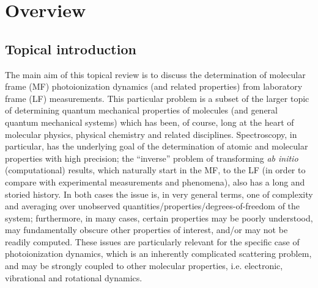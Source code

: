 \documentclass[10pt]{article}
\begin{document}


\section{Overview}

\subsection{Topical introduction}
The main aim of this topical review is to discuss the determination of molecular frame (MF) photoionization dynamics (and related properties) from laboratory frame (LF) measurements. This particular problem is a subset of the larger topic of determining quantum mechanical properties of molecules (and general quantum mechanical systems) which has been, of course, long at the heart of molecular physics, physical chemistry and related disciplines. Spectroscopy, in particular, has the underlying goal of the determination of atomic and molecular properties with high precision; the ``inverse” problem of transforming \textit{ab initio} (computational) results, which naturally start in the MF, to the LF (in order to compare with experimental measurements and phenomena), also has a long and storied history. In both cases the issue is, in very general terms, one of complexity and averaging over unobserved quantities/properties/degrees-of-freedom of the system; furthermore, in many cases, certain properties may be poorly understood, may fundamentally obscure other properties of interest, and/or may not be readily computed. These issues are particularly relevant for the specific case of photoionization dynamics, which is an inherently complicated scattering problem, and may be strongly coupled to other molecular properties, i.e. electronic, vibrational and rotational dynamics. 
\end{document}

